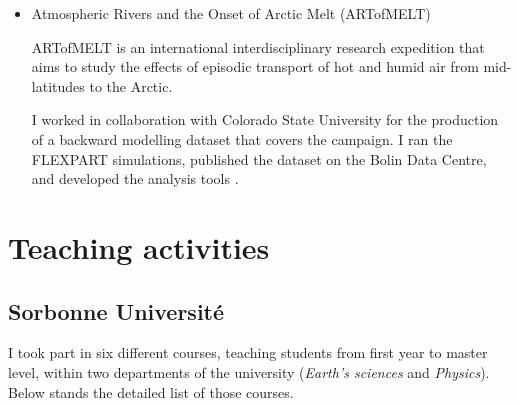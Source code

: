 \begin{itemize}
            My work on the methodological approach of emission source identification (see \cref{chap3}) contributed to the project. I used this method to identify the origins of the air masses which formed the clouds observed during the airborne campaign studied during the project (see \cref{sec:cloud_origins}).

        \item Atmospheric Rivers and the Onset of Arctic Melt (ARTofMELT)

        ARTofMELT is an international interdisciplinary research expedition that aims to study the effects of episodic transport of hot and humid air from mid-latitudes to the Arctic.

            I worked in collaboration with Colorado State University for the production of a backward modelling dataset that covers the campaign. I ran the FLEXPART simulations, published the dataset on the Bolin Data Centre, and developed the analysis tools \citep{da_silva_backward_2025, da_silva_plotting_2025}.

    \end{itemize}


\section*{Teaching activities}
    \subsection*{Sorbonne Université}
    I took part in six different courses, teaching students from first year to master level, within two departments of the university (\textit{Earth's sciences} and \textit{Physics}). 
    Below stands the detailed list of those courses. 
    

